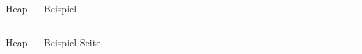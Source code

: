 \documentclass{slides}
\newcounter{mypage}
\begin{document}

\begin{slide}{}
\normalsize

\begin{center}
Heap --- Beispiel
\end{center}
\vspace*{0.5cm}

\footnotesize

\vspace*{\fill}
\tiny \addtocounter{mypage}{1}
\rule{17cm}{1mm}
Heap --- Beispiel \hspace*{\fill} Seite 
\end{slide}

\end{document}
